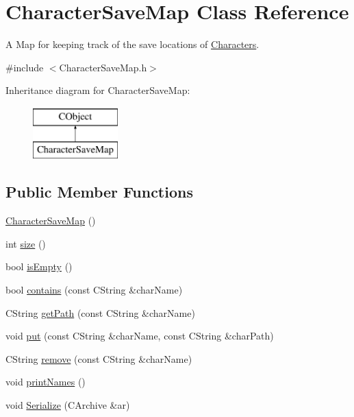 \hypertarget{class_character_save_map}{}\section{Character\+Save\+Map Class Reference}
\label{class_character_save_map}


A Map for keeping track of the save locations of \hyperlink{class_characters}{Characters}.  




{\ttfamily \#include $<$Character\+Save\+Map.\+h$>$}

Inheritance diagram for Character\+Save\+Map\+:\begin{figure}[H]
\begin{center}
\leavevmode
\includegraphics[height=2.000000cm]{class_character_save_map}
\end{center}
\end{figure}
\subsection*{Public Member Functions}
\begin{DoxyCompactItemize}
\item 
\hyperlink{class_character_save_map_a1628139ff98a52d2341b6505d5bae1b0}{Character\+Save\+Map} ()
\item 
int \hyperlink{class_character_save_map_aa08505fbf7f84288fd9c21da0326bf49}{size} ()
\item 
bool \hyperlink{class_character_save_map_ab184ee82d93d3e907a582f1924f05990}{is\+Empty} ()
\item 
bool \hyperlink{class_character_save_map_ab139cd8a2bfb27da4a557689f32715b5}{contains} (const C\+String \&char\+Name)
\item 
C\+String \hyperlink{class_character_save_map_ae522be138bfeab45d12a255020150110}{get\+Path} (const C\+String \&char\+Name)
\item 
void \hyperlink{class_character_save_map_a1b0d8a748f717733e02ca01d2492fc80}{put} (const C\+String \&char\+Name, const C\+String \&char\+Path)
\item 
C\+String \hyperlink{class_character_save_map_a1daaac33e4d3550c29f6dd087d460209}{remove} (const C\+String \&char\+Name)
\item 
void \hyperlink{class_character_save_map_a4e62aa81be98017382c268a2e1165f09}{print\+Names} ()
\item 
void \hyperlink{class_character_save_map_a8470b5c25754acc6eb4761bedaed55d8}{Serialize} (C\+Archive \&ar)
\end{DoxyCompactItemize}
